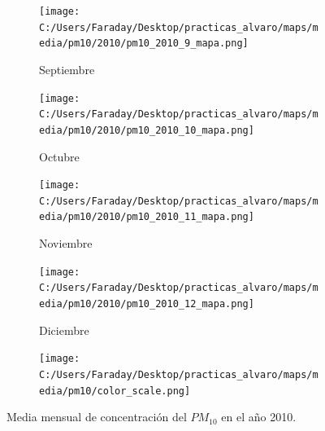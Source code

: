 \documentclass[12pt]{beamer}
\begin{document}
\begin{frame}[squeeze]
\begin{figure}[H]
\begin{subfigure}[H]{0.20\textwidth}
\texttt{[image: C:/Users/Faraday/Desktop/practicas\_alvaro/maps/media/pm10/2010/pm10\_2010\_9\_mapa.png]}
\captionsetup{labelformat=empty}
\caption{\scriptsize Septiembre}
\label{fig:map-pm10-2010-9}
\end{subfigure}
%
\begin{subfigure}[H]{0.20\textwidth}
\texttt{[image: C:/Users/Faraday/Desktop/practicas\_alvaro/maps/media/pm10/2010/pm10\_2010\_10\_mapa.png]}
\captionsetup{labelformat=empty}
\caption{\scriptsize Octubre}
\label{fig:map-pm10-2010-10}
\end{subfigure}
%
\begin{subfigure}[H]{0.20\textwidth}
\texttt{[image: C:/Users/Faraday/Desktop/practicas\_alvaro/maps/media/pm10/2010/pm10\_2010\_11\_mapa.png]}
\captionsetup{labelformat=empty}
\caption{\scriptsize Noviembre}
\label{fig:map-pm10-2010-11}
\end{subfigure}
%
\begin{subfigure}[H]{0.20\textwidth}
\texttt{[image: C:/Users/Faraday/Desktop/practicas\_alvaro/maps/media/pm10/2010/pm10\_2010\_12\_mapa.png]}
\captionsetup{labelformat=empty}
\caption{\scriptsize Diciembre}
\label{fig:map-pm10-2010-12}
\end{subfigure}

\begin{subfigure}[H]{0.45\textwidth}
\texttt{[image: C:/Users/Faraday/Desktop/practicas\_alvaro/maps/media/pm10/color\_scale.png]}
\captionsetup{labelformat=empty}
\caption{}
\end{subfigure}

\vspace*{-7mm}
\caption{\scriptsize Media mensual de concentración del $PM_{10}$ en el año 2010.}
\label{fig:map-pm10-2010}
\end{figure}
\end{frame}
\end{document}
